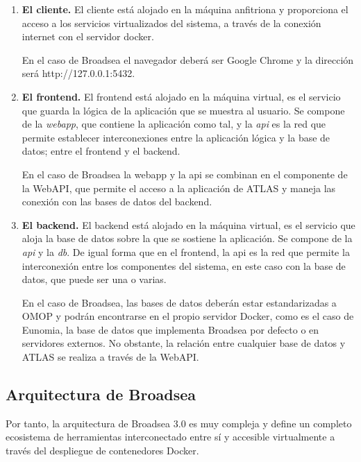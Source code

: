 \begin{enumerate}

    \item \textbf{El cliente.} El cliente está alojado en la máquina anfitriona y proporciona el acceso a los servicios virtualizados del sistema, a través de la conexión internet con el servidor docker.

     En el caso de Broadsea el navegador deberá ser Google Chrome y la dirección será http://127.0.0.1:5432.

    \item \textbf{El frontend.} El frontend está alojado en la máquina virtual, es el servicio que guarda la lógica de la aplicación que se muestra al usuario. Se compone de la \textit{webapp}, que contiene la aplicación como tal, y la \textit{api} es la red que permite establecer interconexiones entre la aplicación lógica y la base de datos; entre el frontend y el backend.

    En el caso de Broadsea la webapp y la api se combinan en el componente de la WebAPI, que permite el acceso a la aplicación de ATLAS y maneja las conexión con las bases de datos del backend.

    \item \textbf{El backend.} El backend está alojado en la máquina virtual, es el servicio que aloja la base de datos sobre la que se sostiene la aplicación. Se compone de la \textit{api} y la \textit{db}. De igual forma que en el frontend, la api es la red que permite la interconexión entre los componentes del sistema, en este caso con la base de datos, que puede ser una o varias.

    En el caso de Broadsea, las bases de datos deberán estar estandarizadas a OMOP y podrán encontrarse en el propio servidor Docker, como es el caso de Eunomia, la base de datos que implementa Broadsea por defecto o en servidores externos. No obstante, la relación entre cualquier base de datos y ATLAS se realiza a través de la WebAPI.

    
\end{enumerate}

\subsection{Arquitectura de Broadsea} \label{sec:07Broadsea}




Por tanto, la arquitectura de Broadsea 3.0 es muy compleja y define un completo ecosistema de herramientas interconectado entre sí y accesible virtualmente a través del despliegue de contenedores Docker.

